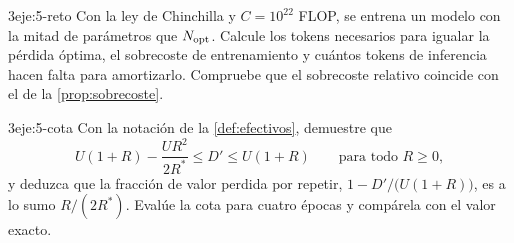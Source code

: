 \begin{ejercicio}{3}{eje:5-reto}
Con la ley de Chinchilla y $C=10^{22}$ FLOP, se entrena un modelo con la mitad de parámetros que $N_{\mathrm{opt}}$. Calcule los tokens necesarios para igualar la pérdida óptima, el sobrecoste de entrenamiento y cuántos tokens de inferencia hacen falta para amortizarlo. Compruebe que el sobrecoste relativo coincide con el de la \cref{prop:sobrecoste}.
\end{ejercicio}

\begin{ejercicio}{3}{eje:5-cota}
Con la notación de la \cref{def:efectivos}, demuestre que
\[
U(1+R)-\frac{UR^{2}}{2R^{*}}\le D'\le U(1+R)\qquad\text{para todo }R\ge 0,
\]
y deduzca que la fracción de valor perdida por repetir, $1-D'/\bigl(U(1+R)\bigr)$, es a lo sumo $R/(2R^{*})$. Evalúe la cota para cuatro épocas y compárela con el valor exacto.
\end{ejercicio}

